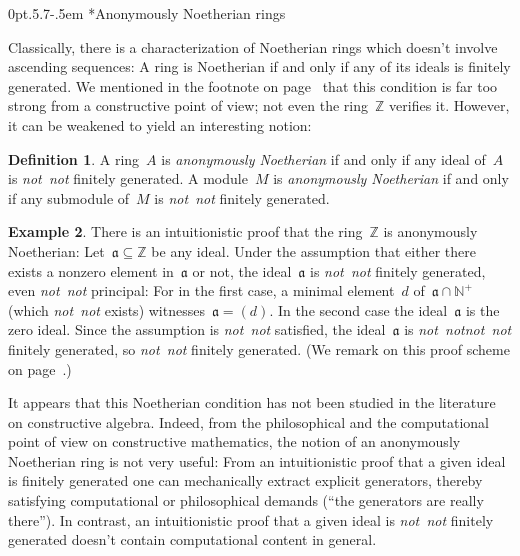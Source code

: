 \documentclass[10pt,reqno,a4paper]{amsbook}
\makeatletter
\theoremstyle{definition}
\newtheorem{defn}{Definition}[section]
\newtheorem{ex}[defn]{Example}
\theoremstyle{plain}
\theoremstyle{remark}
\newcommand{\ZZ}{\mathbb{Z}}
\newcommand{\NN}{\mathbb{N}}
\newcommand{\aaa}{\mathfrak{a}}
\newcommand{\?}{\,{:}\,}
\renewcommand{\_}{\mathpunct{.}\,}
\newcommand{\notnot}{\emph{not~not}\xspace}
\def\subsection{\@startsection{subsection}{2}%
  {0pt}{.5\linespacing\@plus.7\linespacing}{-.5em}%
  {\normalfont\bfseries}}
\makeatother
\begin{document}
{%


\subsection*{Anonymously Noetherian rings}

Classically, there is a characterization of Noetherian rings which doesn't
involve ascending sequences: A ring is Noetherian if and only if any of its
ideals is finitely generated. We mentioned in the footnote on
page~\pageref{fn:z-principal-ideal-domain} that this condition is far too
strong from a constructive point of view; not even the ring~$\ZZ$ verifies it.
However, it can be weakened to yield an interesting notion:

\begin{defn}A ring~$A$ is \emph{anonymously Noetherian} if and only if any ideal
of~$A$ is \notnot finitely generated. A module~$M$ is \emph{anonymously Noetherian}
if and only if any submodule of~$M$ is \notnot finitely generated.\end{defn}

\begin{ex}There is an intuitionistic proof that the ring~$\ZZ$ is anonymously
Noetherian: Let~$\aaa \subseteq \ZZ$ be any ideal. Under the assumption that
either there exists a nonzero element in~$\aaa$ or not, the ideal~$\aaa$ is
\notnot finitely generated, even \notnot principal: For in the first case, a
minimal element~$d$ of~$\aaa \cap \NN^+$ (which \notnot exists) witnesses~$\aaa
= (d)$. In the second case the ideal~$\aaa$ is the zero ideal. Since the
assumption is \notnot satisfied, the ideal~$\aaa$ is \notnot \notnot finitely
generated, so \notnot finitely generated. (We remark on this proof scheme on
page~\pageref{proof-scheme-boxed-statements}.) \end{ex}

It appears that this Noetherian condition has not been studied in the
literature on constructive algebra. Indeed, from the philosophical and the
computational point of view on constructive mathematics, the notion of an anonymously
Noetherian ring is not very useful: From an intuitionistic proof that a given
ideal is finitely generated one can mechanically extract explicit generators,
thereby satisfying computational or philosophical demands (``the generators are
really there''). In contrast, an intuitionistic proof that a given ideal is
\notnot finitely generated doesn't contain computational content in general.

}
\end{document}
